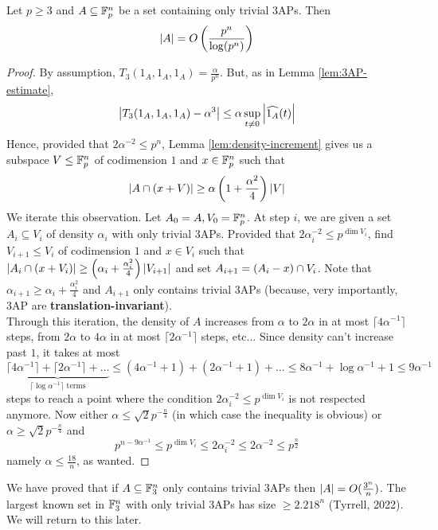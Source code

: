 \documentclass{article}
\begin{document}
\begin{nthm}[Meshulam]\label{thm:meshulam}
  Let $p \ge 3$ and $A \subseteq \mathbb F_p^n$ be a set containing only trivial 3APs. Then
  $$\left\lvert A\right\rvert = O\left(\frac{p^n}{\log(p^n)}\right)$$
\end{nthm}
\begin{proof}
  By assumption, $T_3(1_A, 1_A, 1_A) = \frac\alpha{p^n}$. But, as in Lemma \ref{lem:3AP-estimate},
  $$\left\lvert T_3(1_A, 1_A, 1_A) - \alpha^3\right\rvert \le \alpha \sup_{t \ne 0} \left\lvert \widehat{1_A}(t)\right\rvert$$
  Hence, provided that $2\alpha^{-2} \le p^n$, Lemma \ref{lem:density-increment} gives us a subspace $V \le \mathbb F_p^n$ of codimension $1$ and $x \in \mathbb F_p^n$ such that
  $$\left\lvert A \cap (x + V)\right\rvert \ge \alpha\left(1 + \frac{\alpha^2}4\right)\left\lvert V\right\rvert$$
  We iterate this observation. Let $A_0 = A, V_0 = \mathbb F_p^n$. At step $i$, we are given a set $A_i \subseteq V_i$ of density $\alpha_i$ with only trivial 3APs. Provided that $2\alpha_i^{-2} \le p^{\dim V_i}$, find $V_{i + 1} \le V_i$ of codimension $1$ and $x \in V_i$ such that $\left\lvert A_i \cap (x + V_i)\right\rvert \ge \left(\alpha_i + \frac{\alpha_i^2}4\right)\left\lvert V_{i + 1}\right\rvert$ and set $A_{i + 1} = (A_i - x) \cap V_i$. Note that $\alpha_{i + 1} \ge \alpha_i + \frac{\alpha_i^2}4$ and $A_{i + 1}$ only contains trivial 3APs (because, very importantly, 3AP are {\bf translation-invariant}). \\
  Through this iteration, the density of $A$ increases from $\alpha$ to $2\alpha$ in at most $\lceil 4\alpha^{-1}\rceil$ steps, from $2\alpha$ to $4\alpha$ in at most $\lceil 2\alpha^{-1}\rceil$ steps, etc... Since density can't increase past $1$, it takes at most
  $$\underbrace{\lceil 4\alpha^{-1}\rceil + \lceil 2\alpha^{-1}\rceil + \dots}_{\lceil \log \alpha^{-1}\rceil \text{ terms}} \le (4\alpha^{-1} + 1) + (2\alpha^{-1} + 1) + \dots \le 8\alpha^{-1} + \log \alpha^{-1} + 1 \le 9\alpha^{-1}$$
  steps to reach a point where the condition $2\alpha_i^{-2} \le p^{\dim V_i}$ is not respected anymore. Now either $\alpha \le \sqrt 2 p^{-\frac n4}$ (in which case the inequality is obvious) or $\alpha \ge \sqrt 2 p^{-\frac n4}$ and
  $$p^{n - 9\alpha^{-1}} \le p^{\dim V_i} \le 2\alpha_i^{-2} \le 2\alpha^{-2} \le p^{\frac n2}$$
  namely $\alpha \le \frac{18}n$, as wanted.
\end{proof}

\newlec

We have proved that if $A \subseteq \mathbb F_3^n$ only contains trivial 3APs then $\left\lvert A\right\rvert = O(\frac{3^n}n)$. The largest known set in $\mathbb F_3^n$ with only trivial 3APs has size $\ge 2.218^n$ (Tyrrell, 2022). We will return to this later.
\end{document}
